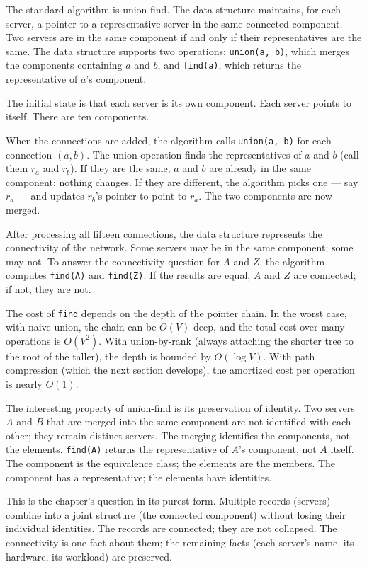 The standard algorithm is union-find. The data structure maintains, for
each server, a pointer to a representative server in the same connected
component. Two servers are in the same component if and only if their
representatives are the same. The data structure supports two operations:
\texttt{union(a, b)}, which merges the components containing $a$ and
$b$, and \texttt{find(a)}, which returns the representative of $a$'s
component.

The initial state is that each server is its own component. Each server
points to itself. There are ten components.

When the connections are added, the algorithm calls \texttt{union(a, b)}
for each connection $(a, b)$. The union operation finds the
representatives of $a$ and $b$ (call them $r_a$ and $r_b$). If they are
the same, $a$ and $b$ are already in the same component; nothing changes.
If they are different, the algorithm picks one --- say $r_a$ --- and
updates $r_b$'s pointer to point to $r_a$. The two components are now
merged.

After processing all fifteen connections, the data structure represents
the connectivity of the network. Some servers may be in the same
component; some may not. To answer the connectivity question for $A$ and
$Z$, the algorithm computes \texttt{find(A)} and \texttt{find(Z)}. If
the results are equal, $A$ and $Z$ are connected; if not, they are not.

The cost of \texttt{find} depends on the depth of the pointer chain.
In the worst case, with naive union, the chain can be $O(V)$ deep, and
the total cost over many operations is $O(V^2)$. With union-by-rank
(always attaching the shorter tree to the root of the taller), the depth
is bounded by $O(\log V)$. With path compression (which the next section
develops), the amortized cost per operation is nearly $O(1)$.

The interesting property of union-find is its preservation of identity.
Two servers $A$ and $B$ that are merged into the same component are not
identified with each other; they remain distinct servers. The merging
identifies the components, not the elements. \texttt{find(A)} returns
the representative of $A$'s component, not $A$ itself. The component is
the equivalence class; the elements are the members. The component has a
representative; the elements have identities.

This is the chapter's question in its purest form. Multiple records
(servers) combine into a joint structure (the connected component)
without losing their individual identities. The records are connected;
they are not collapsed. The connectivity is one fact about them; the
remaining facts (each server's name, its hardware, its workload) are
preserved.


